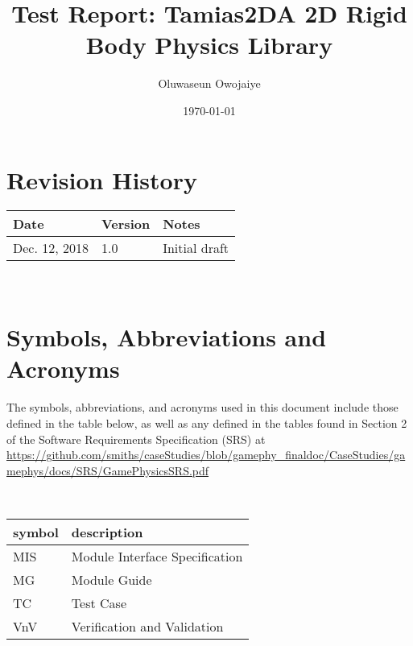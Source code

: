 \documentclass[12pt, titlepage]{article}
\newcommand{\progname}{Tamias2D}
\begin{document}
\title{Test Report: \progname A 2D Rigid Body Physics Library} 
\author{Oluwaseun Owojaiye}
\date{\today}
	
\maketitle


\section{Revision History}

\begin{tabularx}{\textwidth}{p{3cm}p{2cm}X}
\toprule {\bf Date} & {\bf Version} & {\bf Notes}\\
\midrule
Dec. 12, 2018 & 1.0 & Initial draft\\
\bottomrule
\end{tabularx}

~\newpage

\section{Symbols, Abbreviations and Acronyms}


The symbols, abbreviations, and acronyms used in this document include those defined in the table below, as well as any defined in the tables found in Section 2 of the Software Requirements Specification (SRS) at
\url {https://github.com/smiths/caseStudies/blob/gamephy_finaldoc/CaseStudies/gamephys/docs/SRS/GamePhysicsSRS.pdf}

~\newline
\renewcommand{\arraystretch}{1.2}

\begin{tabular}{l l} 
	
	\toprule		
	
	\textbf{symbol} & \textbf{description}\\
	
	\midrule
	
	MIS & Module Interface Specification\\
	
	MG & Module Guide\\
	
	TC & Test Case\\
	
	VnV & Verification and Validation\\
	
	\bottomrule
	
\end{tabular}\\
\newpage
\end{document}
